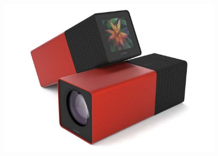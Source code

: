 \documentclass{beamer}
\begin{document}
	\begin{frame}
		\begin{figure}
			\centering
			\includegraphics[scale=0.4]{144.jpg}
		\end{figure}
	\end{frame}
	
	
\end{document}
